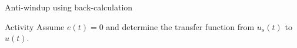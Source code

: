 \documentclass[presentation,aspectratio=169, usenames, dvipsnames]{beamer}
\begin{document}
\begin{frame}[label={sec:orgf3973e5}]{Anti-windup using back-calculation}
\begin{center}
\end{center}

\alert{Activity} Assume \(e(t)=0\) and determine the transfer function from \(u_s(t)\) to \(u(t)\).
\end{frame}
\end{document}
